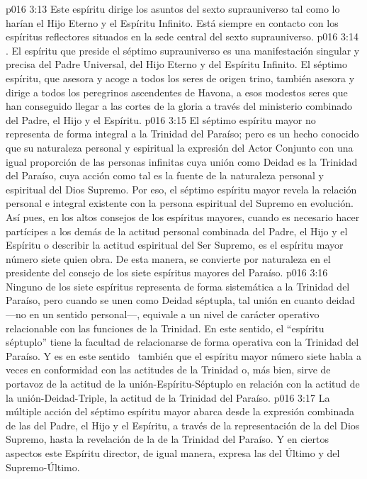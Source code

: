 \vs p016 3:13 Este espíritu dirige los asuntos del sexto suprauniverso tal como lo harían el Hijo Eterno y el Espíritu Infinito. Está siempre en contacto con los espíritus reflectores situados en la sede central del sexto suprauniverso.
\vs p016 3:14 \pc {}. El espíritu que preside el séptimo suprauniverso es una manifestación singular y precisa del Padre Universal, del Hijo Eterno y del Espíritu Infinito. El séptimo espíritu, que asesora y acoge a todos los seres de origen trino, también asesora y dirige a todos los peregrinos ascendentes de Havona, a esos modestos seres que han conseguido llegar a las cortes de la gloria a través del ministerio combinado del Padre, el Hijo y el Espíritu.
\vs p016 3:15 El séptimo espíritu mayor no representa de forma integral a la Trinidad del Paraíso; pero es un hecho conocido que su naturaleza personal y espiritual  la expresión del Actor Conjunto con una igual proporción de las personas infinitas cuya unión como Deidad es la Trinidad del Paraíso, cuya acción como tal es la fuente de la naturaleza personal y espiritual del Dios Supremo. Por eso, el séptimo espíritu mayor revela la relación personal e integral existente con la persona espiritual del Supremo en evolución. Así pues, en los altos consejos de los espíritus mayores, cuando es necesario hacer partícipes a los demás de la actitud personal combinada del Padre, el Hijo y el Espíritu o describir la actitud espiritual del Ser Supremo, es el espíritu mayor número siete quien obra. De esta manera, se convierte por naturaleza en el presidente del consejo de los siete espíritus mayores del Paraíso.
\vs p016 3:16 Ninguno de los siete espíritus representa de forma sistemática a la Trinidad del Paraíso, pero cuando se unen como Deidad séptupla, tal unión en cuanto deidad ---no en un sentido personal---, equivale a un nivel de carácter operativo relacionable con las funciones de la Trinidad. En este sentido, el “espíritu séptuplo” tiene la facultad de relacionarse de forma operativa con la Trinidad del Paraíso. Y es en este sentido  también que el espíritu mayor número siete habla a veces en conformidad con las actitudes de la Trinidad o, más bien, sirve de portavoz de la actitud de la unión\hyp{}Espíritu\hyp{}Séptuplo en relación con la actitud de la unión\hyp{}Deidad\hyp{}Triple, la actitud de la Trinidad del Paraíso.
\vs p016 3:17 La múltiple acción del séptimo espíritu mayor abarca desde la expresión combinada de las  del Padre, el Hijo y el Espíritu, a través de la representación de la  del Dios Supremo, hasta la revelación de la  de la Trinidad del Paraíso. Y en ciertos aspectos este Espíritu director, de igual manera, expresa las  del Último y del Supremo\hyp{}Último.
